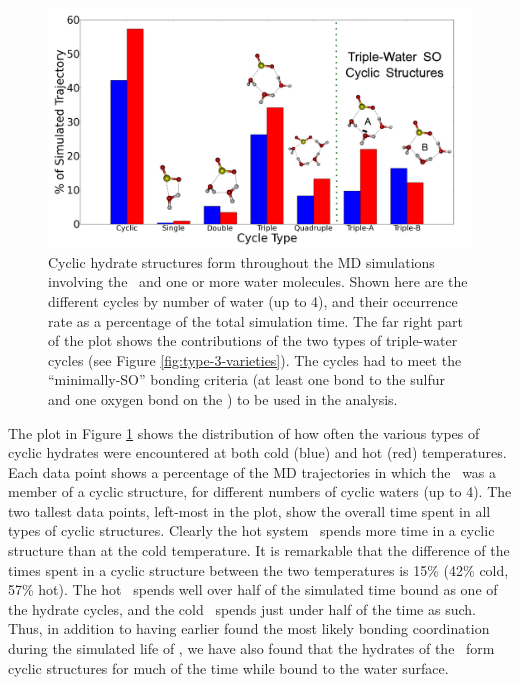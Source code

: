 \begin{figure}[h!]
	\begin{center}
		\includegraphics[scale=1.0]{images/cycles/SO-cycle-breakdown-with-cartoons-small.png}
		\caption{Cyclic hydrate structures form throughout the MD simulations involving the \suldiox~and one or more water molecules. Shown here are the different cycles by number of water (up to 4), and their occurrence rate as a percentage of the total simulation time. The far right part of the plot shows the contributions of the two types of triple-water cycles (see Figure \ref{fig:type-3-varieties}). The cycles had to meet the ``minimally-SO'' bonding criteria (at least one bond to the sulfur and one oxygen bond on the \suldiox) to be used in the analysis.}
		\label{fig:cyclic-breakdown}
	\end{center}
\end{figure}

The plot in Figure \ref{fig:cyclic-breakdown} shows the distribution of how often the various types of cyclic hydrates were encountered at both cold (blue) and hot (red) temperatures. Each data point shows a percentage of the MD trajectories in which the \suldiox~was a member of a cyclic structure, for different numbers of cyclic waters (up to 4). The two tallest data points, left-most in the plot, show the overall time spent in all types of cyclic structures. Clearly the hot system \suldiox~spends more time in a cyclic structure than at the cold temperature. It is remarkable that the difference of the times spent in a cyclic structure between the two temperatures is 15\% (42\% cold, 57\% hot). The hot \suldiox~spends well over half of the simulated time bound as one of the hydrate cycles, and the cold \suldiox~spends just under half of the time as such. Thus, in addition to having earlier found the most likely bonding coordination during the simulated life of \suldiox, we have also found that the hydrates of the \suldiox~form cyclic structures for much of the time while bound to the water surface.

